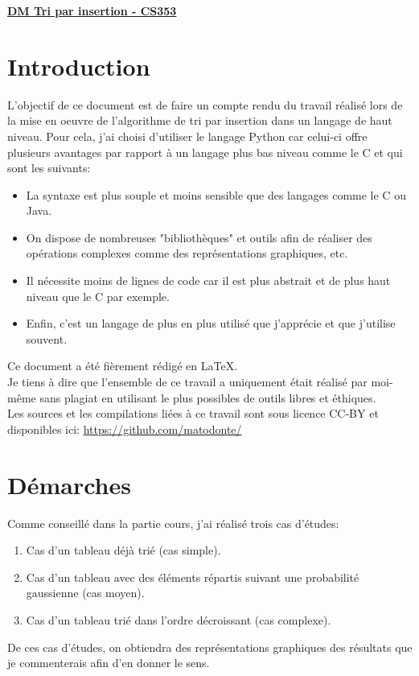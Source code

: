 \documentclass[a4paper,12pt]{article}
\begin{document}
\begin{center}
\underline{\huge \textbf{DM Tri par insertion - CS353} }
\end{center}
\normalsize
\section{Introduction}
L'objectif de ce document est de faire un compte rendu du travail réalisé lors de la mise en oeuvre de l'algorithme de tri par insertion dans un langage de haut niveau. Pour cela, j'ai choisi d'utiliser le langage Python car celui-ci offre plusieurs avantages par rapport à un langage plus bas niveau comme le C et qui sont les suivants:
\begin{itemize}
  \item La syntaxe est plus souple et moins sensible que des langages comme le C ou Java.
  \item On dispose de nombreuses "bibliothèques" et outils afin de réaliser des opérations complexes comme des représentations graphiques, etc.
  \item Il nécessite moins de lignes de code car il est plus abstrait et de plus haut niveau que le C par exemple. 
  \item Enfin, c'est un langage de plus en plus utilisé que j'apprécie et que j'utilise souvent.
\end{itemize}
Ce document a été fièrement rédigé en \LaTeX. \\ 
Je tiens à dire que l'ensemble de ce travail a uniquement était réalisé par moi-même sans plagiat en utilisant le plus possibles de outils libres et éthiques. \\
Les sources et les compilations liées à ce travail sont sous licence CC-BY et disponibles ici: \url{https://github.com/matodonte/}
\section{Démarches}
Comme conseillé dans la partie cours, j'ai réalisé trois cas d'études:
\begin{enumerate}
  \item Cas d'un tableau déjà trié (cas simple).
  \item Cas d'un tableau avec des éléments répartis suivant une probabilité gaussienne (cas moyen).
  \item Cas d'un tableau trié dans l'ordre décroissant (cas complexe).
\end{enumerate}
De ces cas d'études, on obtiendra des représentations graphiques des résultats que je commenterais afin d'en donner le sens.
\end{document}
